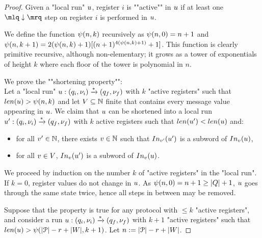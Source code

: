 \begin{proof}
	Given a "local run" $u$, register $i$ is ""active"" in $u$ if at least one $\quotemarks{\enregact}$ step on register $i$ is performed in $u$. 
	
	We define the function $\psi(n,k)$ recursively as $\psi(n,0) = n+1$ and $\psi(n,k+1) = 2(\psi(n,k) +1) [(n+1)^{4(\psi(n,k)+1)} +1]$. This function is clearly primitive recursive, although non-elementary; it grows as a tower of exponentials of height $k$ where each floor of the tower is polynomial in $n$.
	
	We prove the ""shortening property"": \\
	Let a "local run" $u: (q_i, \nu_i) \xrightarrow{*} (q_f, \nu_f)$ with $k$ "active registers" such that $\length{\localrun} > \towerfun(n,k)$ and let $V \subseteq \mathbb{N}$ finite that contains every message value appearing in $u$. We claim that $u$ can be shortened into a local run $u': (q_i, \nu_i) \xrightarrow{*} (q_f, \nu_f)$ with $k$ active registers such that $\length{\localrun'} < \length{\localrun}$ and:
	\begin{itemize}
		\item for all $v' \in \mathbb{N}$, there exists $v \in \mathbb{N}$ such that $\vinput{\aval'}{\localrun'}$ is a subword of $\vinput{\aval}{\localrun}$,
		\item for all $v \in V$, $\vinput{\aval}{\localrun'}$ is a subword of $\vinput{\aval}{\localrun}$. 
	\end{itemize}
	
	We proceed by induction on the number $k$ of "active registers" in the "local run". If $k=0$, register values do not change in $u$. As $\psi(n,0) = n+1 \geq |Q|+1$, $u$ goes through the same state twice, hence all steps in between may be removed. 
	
	Suppose that the property is true for any protocol with $\leq k$ "active registers", and consider a run $u: (q_i,\nu_i) \xrightarrow{*} (q_f,\nu_f)$ with $k+1$ "active registers" such that $\length{\localrun} > \towerfun(\size{\prot} -r + \size{\Vinit},k+1)$. Let $n:=|\mathcal{P}| -r + |W|$.
	

\end{proof}
